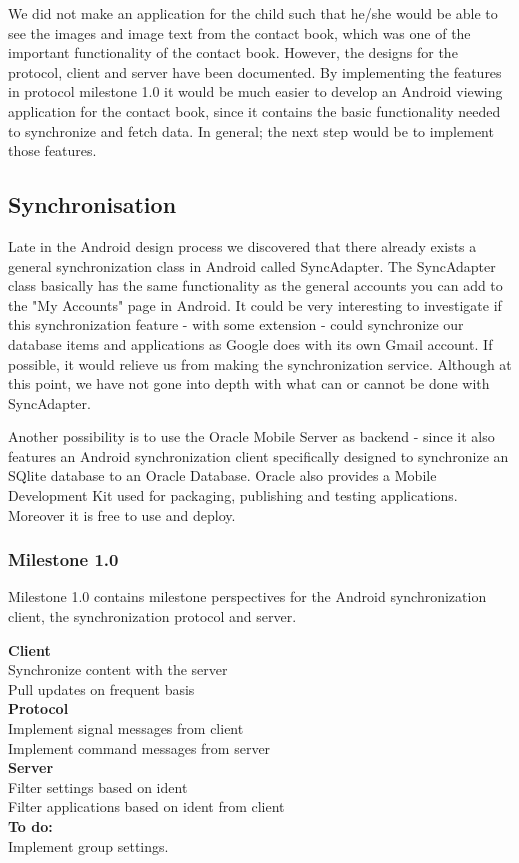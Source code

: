 \label{androidReflection}
We did not make an application for the child such that he/she would be able to see the images and image text from the contact book, which was one of the important functionality of the contact book. However, the designs for the protocol, client and server have been documented. By implementing the features in protocol milestone 1.0 it would be much easier to develop an Android viewing application for the contact book, since it contains the basic functionality needed to synchronize and fetch data. In general; the next step would be to implement those features. 

\subsection{Synchronisation}
Late in the Android design process we discovered that there already exists a general synchronization class in Android called SyncAdapter. The SyncAdapter class basically has the same functionality as the general accounts you can add to the "My Accounts" page in Android\cite{AndDevel4}. It could be very interesting to investigate if this synchronization feature - with some extension - could synchronize our database items and applications as Google does with its own Gmail account. If possible, it would relieve us from making the synchronization service. Although at this point, we have not gone into depth with what can or cannot be done with SyncAdapter. 

Another possibility is to use the Oracle Mobile Server as backend - since it also features an Android synchronization client specifically designed to synchronize an SQlite database to an Oracle Database. Oracle also provides a Mobile Development Kit used for packaging, publishing and testing applications. Moreover it is free to use and deploy\cite{Oracle}.  

\subsubsection*{Milestone 1.0}
Milestone 1.0 contains milestone perspectives for the Android synchronization client, the synchronization protocol and server.  

\textbf{Client}\\
Synchronize content with the server\\
Pull updates on frequent basis\\

\textbf{Protocol}\\
Implement signal messages from client\\
Implement command messages from server\\

\textbf{Server}\\
Filter settings based on ident\\
Filter applications based on ident from client\\

\textbf{To do:}\\
Implement group settings.  
